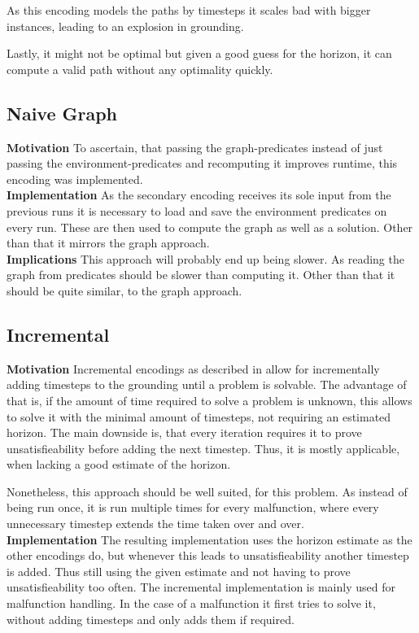 As this encoding models the paths by timesteps it scales bad with bigger instances, leading to an explosion in grounding.

Lastly, it might not be optimal but given a good guess for the horizon, it can compute a valid path without any optimality quickly.

\subsection{Naive Graph}
\noindent \textbf{Motivation} To ascertain, that passing the graph-predicates instead of just passing the environment-predicates and recomputing it improves runtime, this encoding was implemented.\\

\noindent \textbf{Implementation} As the secondary encoding receives its sole input from the previous runs it is necessary to load and save the environment predicates on every run. These are then used to compute the graph as well as a solution. Other than that it mirrors the graph approach.\\

\noindent \textbf{Implications} This approach will probably end up being slower. As reading the graph from predicates should be slower than computing it. Other than that it should be quite similar, to the graph approach.

\subsection{Incremental}
\textbf{Motivation} Incremental encodings as described in \cite{incr} allow for incrementally adding timesteps to the grounding until a problem is solvable. The advantage of that is, if the amount of time required to solve a problem is unknown, this allows to solve it with the minimal amount of timesteps, not requiring an estimated horizon. The main downside is, that every iteration requires it to prove unsatisfieability before adding the next timestep. Thus, it is mostly applicable, when lacking a good estimate of the horizon.

Nonetheless, this approach should be well suited, for this problem. As instead of being run once, it is run multiple times for every malfunction, where every unnecessary timestep extends the time taken over and over. \\

\noindent \textbf{Implementation} The resulting implementation uses the horizon estimate as the other encodings do, but whenever this leads to unsatisfieability another timestep is added. Thus still using the given estimate and not having to prove unsatisfieability too often. The incremental implementation is mainly used for malfunction handling. In the case of a malfunction it first tries to solve it, without adding timesteps and only adds them if required.

